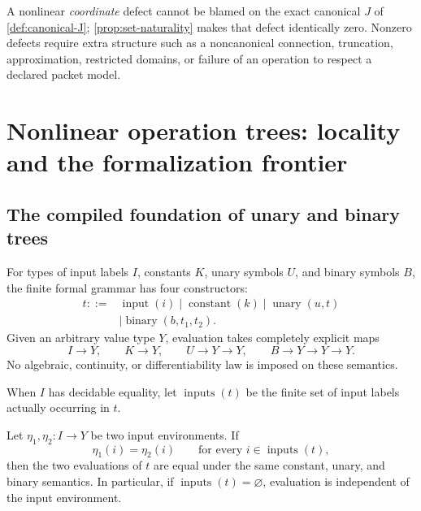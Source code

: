 \begin{boundary}
A nonlinear \emph{coordinate} defect cannot be blamed on the exact canonical
$J$ of \cref{def:canonical-J}; \cref{prop:set-naturality} makes that defect
identically zero.  Nonzero defects require extra structure such as a
noncanonical connection, truncation, approximation, restricted domains, or
failure of an operation to respect a declared packet model.
\end{boundary}

\clearpage\section{Nonlinear operation trees: locality and the formalization frontier}
\label{sec:operation-trees}

\subsection{The compiled foundation of unary and binary trees}

\begin{definition}
\label{def:compiled-operation-tree}
For types of input labels $I$, constants $K$, unary symbols $U$, and binary
symbols $B$, the finite formal grammar has four constructors:
\[
\begin{aligned}
t ::={}&\operatorname{input}(i)
\mid\operatorname{constant}(k)
\mid\operatorname{unary}(u,t)\\
&\mid\operatorname{binary}(b,t_1,t_2).
\end{aligned}
\]
Given an arbitrary value type $Y$, evaluation takes completely explicit maps
\[
I\to Y,\qquad K\to Y,\qquad U\to Y\to Y,\qquad
B\to Y\to Y\to Y.
\]
No algebraic, continuity, or differentiability law is imposed on these
semantics.
\end{definition}

When $I$ has decidable equality, let $\operatorname{inputs}(t)$ be the finite
set of input labels actually occurring in $t$.

\begin{theorem}
\label{thm:tree-locality}
Let $\eta_1,\eta_2:I\to Y$ be two input environments.  If
\[
\eta_1(i)=\eta_2(i)
\qquad\text{for every }i\in\operatorname{inputs}(t),
\]
then the two evaluations of $t$ are equal under the same constant, unary, and
binary semantics.  In particular, if
$\operatorname{inputs}(t)=\varnothing$, evaluation is independent of the
input environment.
\end{theorem}

